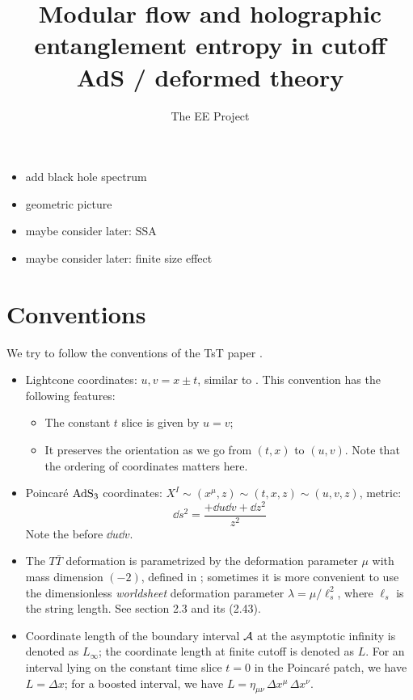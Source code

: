 \documentclass[11pt,a4paper,utf8]{article}
\title{Modular flow and holographic entanglement entropy in cutoff AdS / \TTbar deformed theory}
\author[a]{The EE \TTbar Project}
\affiliation[a]{Yau Mathematical Sciences Center, Tsinghua University, Beijing 100084, China}
\newcommand{\TTbar}{\ensuremath{T\bar{T}}\xspace}
\begin{document}
\maketitle

\setlength{\parskip}{.5\baselineskip}

\addtocounter{section}{-1}

\begin{itemize}
\item add black hole spectrum 
\item geometric picture
\item maybe consider later: SSA 
\item maybe consider later: finite size effect  
\end{itemize}

\pagebreak

\section{Conventions}
	We try to follow the conventions of the TsT paper \textcite{Apolo:2019zai}. 
	\begin{itemize}
	\item Lightcone coordinates: $u,v = x\pm t$, similar to \cite{Apolo:2019zai}. This convention has the following features:
	
		\begin{itemize}
		\item The constant $t$ slice is given by $u = v$;
		\item It preserves the orientation as we go from $(t,x)$ to $(u,v)$. Note that the ordering of coordinates matters here.
		\end{itemize}
	
	\item Poincar\'e $\mathrm{AdS}_3$ coordinates: $
			X^I \sim (x^\mu,z) \sim (t,x,z) \sim (u,v,z)
		$, metric: 
	\begin{equation}
		\dd{s}^2
		= \frac{+\dd{u} \dd{v} + \dd{z}^2}{z^2}
	\end{equation}
	Note the \mquote{+} before $\dd{u} \dd{v}$. 
	
	\item The \TTbar deformation is parametrized by the deformation parameter $\mu$ with mass dimension $(-2)$, defined in \cite{Apolo:2019zai}; sometimes it is more convenient to use the dimensionless \textit{worldsheet} deformation parameter $\lambda = \mu/\ell_s^2$, where $\ell_s$ is the string length. See \cite{Apolo:2019zai} section 2.3 and its (2.43). 
	
	\item Coordinate length of the boundary interval $\mathcal{A}$ at the asymptotic infinity is denoted as $L_\infty$; the coordinate length at finite cutoff is denoted as $L$. For an interval lying on the constant time slice $t = 0$ in the Poincar\'e patch, we have $L = \Delta x$; for a boosted interval, we have $
		L = \eta_{\mu\nu}\, \Delta x^\mu\, \Delta x^\nu
	$. 
	\end{itemize}
	
\end{document}
